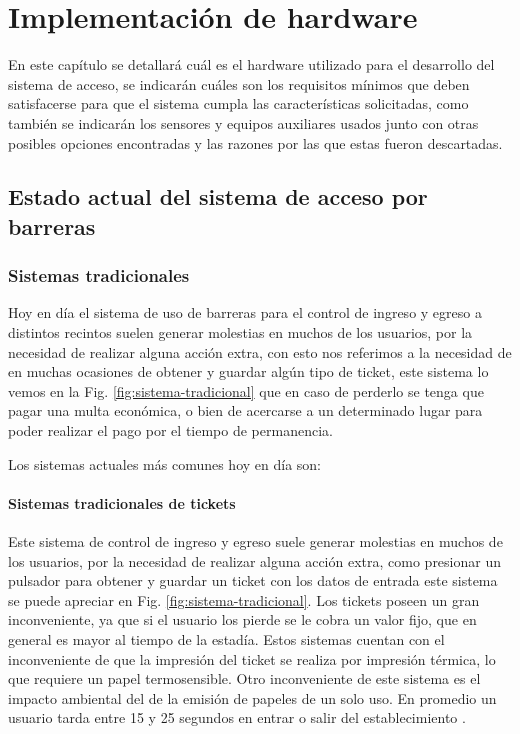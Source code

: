 \chapter{Implementación de hardware}
En este capítulo se detallará cuál es el hardware utilizado para el desarrollo del sistema de acceso, se indicarán cuáles
son los requisitos mínimos que deben satisfacerse para que el sistema cumpla las características solicitadas, como
también se indicarán los sensores y equipos auxiliares usados junto con otras posibles opciones encontradas y las
razones por las que estas fueron descartadas.


\section{Estado actual del sistema de acceso por barreras}

\subsection{Sistemas tradicionales}

Hoy en día el sistema de uso de barreras para el control de ingreso y egreso a distintos recintos suelen generar molestias
en muchos de los usuarios, por la necesidad de realizar alguna acción extra, con esto nos referimos a la necesidad de
en muchas ocasiones de obtener y guardar algún tipo de ticket, este sistema lo vemos en la Fig. \ref{fig:sistema-tradicional}
que en caso de perderlo se tenga que pagar una multa económica, o bien de acercarse a un determinado lugar para poder realizar el pago por el tiempo de permanencia.

Los sistemas actuales más comunes hoy en día son:

\subsubsection*{Sistemas tradicionales de tickets}

Este sistema de control de ingreso y egreso suele generar molestias en muchos de los usuarios, por la necesidad de realizar alguna acción extra, como presionar un pulsador para obtener y guardar un ticket con los datos de entrada este sistema se puede apreciar en Fig. \ref{fig:sistema-tradicional}.
Los tickets poseen un gran inconveniente, ya que si el usuario los pierde se le cobra un valor fijo, que en general es mayor al tiempo de la estadía.
Estos sistemas cuentan con el inconveniente de que la impresión del ticket se realiza por impresión térmica, lo que requiere un papel termosensible.
Otro inconveniente de este sistema es el impacto ambiental del de la emisión de papeles de un solo uso. En promedio un usuario tarda entre 15 y 25 segundos en entrar o salir del establecimiento \cite{casadomo_sistema_2015}.

